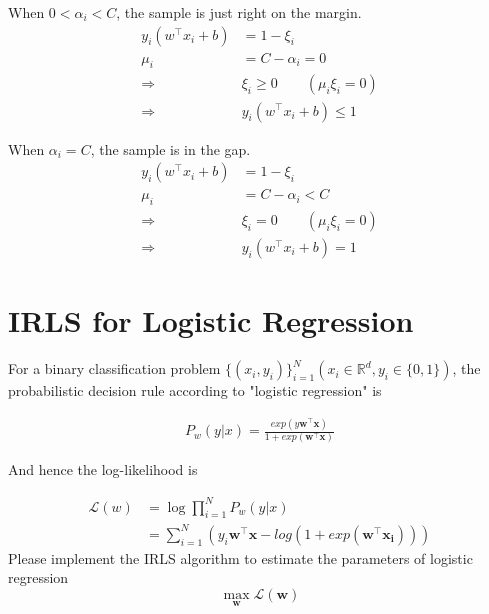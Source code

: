 \documentclass[a4paper]{article}
\begin{document}
When $0 < \alpha_i < C$, the sample is just right on the margin.
\begin{equation}
    \begin{aligned}
    y_i(w^{\top} x_i + b) &= 1 -\xi_i \\
    \mu_i  & = C- \alpha_i =0 \\
    \Rightarrow & \xi_i \ge 0 \qquad (\mu_i \xi_i = 0 )\\
    \Rightarrow & y_i(w^{\top} x_i + b) \le 1  
    \end{aligned}
\end{equation}

When $\alpha_i = C$,  the sample is in the gap.
\begin{equation}
    \begin{aligned}
    y_i(w^{\top} x_i + b) &= 1 -\xi_i \\
    \mu_i  & = C- \alpha_i < C\\
    \Rightarrow & \xi_i = 0 \qquad (\mu_i \xi_i = 0 )\\
    \Rightarrow & y_i(w^{\top} x_i + b) = 1  
    \end{aligned}
\end{equation}




\section{IRLS for Logistic Regression}

For a binary classification problem $\{(x_i , y_i )\}^{N}_{i=1} (x_i \in \mathbb{R}^d , y_i \in \{0, 1\})$, the probabilistic decision rule according to "logistic regression" is

\begin{equation}
    \begin{aligned}
        P_w(y|x) = \frac{exp(y\pmb{w}^{\top}\pmb{x})}{1+exp(\pmb{w}^{\top}\pmb{x})}
    \end{aligned}
\end{equation}

And hence the log-likelihood is

\begin{equation}
    \begin{aligned}
        \mathcal{L}(w) &= \log \prod_{i=1}^{N} P_w(y|x) \\
        &= \sum_{i=1}^{N}(y_i\pmb{w}^{\top}\pmb{x} - log(1+exp(\pmb{w}^{\top}\pmb{x_i})))
    \end{aligned}
\end{equation}
Please implement the IRLS algorithm to estimate the parameters of logistic regression
\begin{equation}
    \max_{\pmb{w} }\mathcal{L(\pmb{w})}
\end{equation}
\end{document}
